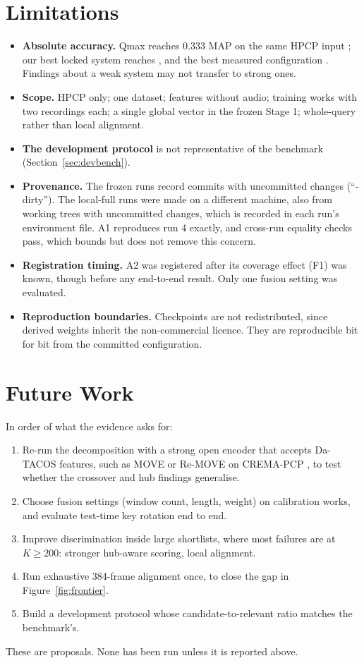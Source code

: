 \documentclass[10pt]{article}
\begin{document}
\section{Limitations}\label{sec:limits}
\begin{itemize}
\item \textbf{Absolute accuracy.} Qmax reaches 0.333 MAP on the same HPCP input \citep{datacos}; our best locked system reaches \ClassicalHubMap, and the best measured configuration \ATwoMapFiveHundred. Findings about a weak system may not transfer to strong ones.
\item \textbf{Scope.} HPCP only; one dataset; features without audio; training works with two recordings each; a single global vector in the frozen Stage 1; whole-query rather than local alignment.
\item \textbf{The development protocol} is not representative of the benchmark (Section~\ref{sec:devbench}).
\item \textbf{Provenance.} The frozen runs record commits with uncommitted changes (``-dirty''). The local-full runs were made on a different machine, also from working trees with uncommitted changes, which is recorded in each run's environment file. A1 reproduces run 4 exactly, and cross-run equality checks pass, which bounds but does not remove this concern.
\item \textbf{Registration timing.} A2 was registered after its coverage effect (F1) was known, though before any end-to-end result. Only one fusion setting was evaluated.
\item \textbf{Reproduction boundaries.} Checkpoints are not redistributed, since derived weights inherit the non-commercial licence. They are reproducible bit for bit from the committed configuration.
\end{itemize}

\section{Future Work}\label{sec:future}
In order of what the evidence asks for:
\begin{enumerate}
\item Re-run the decomposition with a strong open encoder that accepts Da-TACOS features, such as MOVE or Re-MOVE on CREMA-PCP \citep{move2020,remove2020}, to test whether the crossover and hub findings generalise.
\item Choose fusion settings (window count, length, weight) on calibration works, and evaluate test-time key rotation end to end.
\item Improve discrimination inside large shortlists, where most failures are at $K\ge200$: stronger hub-aware scoring, local alignment.
\item Run exhaustive 384-frame alignment once, to close the gap in Figure~\ref{fig:frontier}.
\item Build a development protocol whose candidate-to-relevant ratio matches the benchmark's.
\end{enumerate}
These are proposals. None has been run unless it is reported above.
\end{document}
